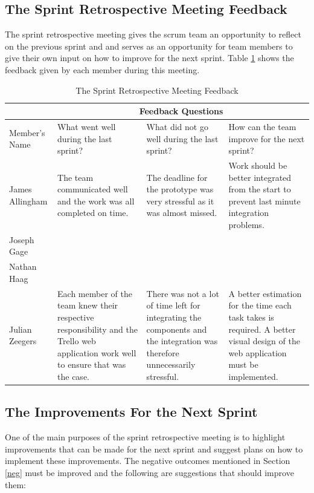 \documentclass[12pt,onecolumn]{article}
\begin{document}
	\subsection{The Sprint Retrospective Meeting Feedback}
	The sprint retrospective meeting gives the scrum team an opportunity to reflect on the previous sprint and and serves as an opportunity for team members to give their own input on how to improve for the next sprint. Table \ref{feedback} shows the feedback given by each member during this meeting.
	
	\begin{table}[h!]
		\caption{The Sprint Retrospective Meeting Feedback\label{feedback}}
		\small
		\begin{tabular}{|>{\centering\arraybackslash}p{1.8cm}|p{3.4cm}|p{3.4cm}|p{3.4cm}|}
			\hline
			\multicolumn{1}{|c|}{}  &  \multicolumn{3}{c|}{Feedback Questions}  \\
			\hline
			Member's Name & What went well during the last sprint? & What did not go well during the last sprint? & How can the team improve for the next sprint? \\
			\hline
			James Allingham & The team communicated well and the work was all completed on time. & The deadline for the prototype was very stressful as it was almost missed. & Work should be better integrated from the start to prevent last minute integration problems. \\
			\hline
			Joseph Gage & & & \\
			\hline
			Nathan Haag & & & \\
			\hline
			Julian Zeegers & Each member of the team knew their respective responsibility and the Trello web application work well to ensure that was the case. & There was not a lot of time left for integrating the components and the integration was therefore unnecessarily stressful.   & A better estimation for the time each task takes is required. A better visual design of the web application must be implemented.\\
			\hline
			
			
		\end{tabular}
	\end{table}
	
	
	\subsection{The Improvements For the Next Sprint}
	One of the main purposes of the sprint retrospective meeting is to highlight improvements that can be made for the next sprint and suggest plans on how to implement these improvements. The negative outcomes mentioned in Section \ref{neg} must be improved and the following are suggestions that should improve them:
	
\end{document}
